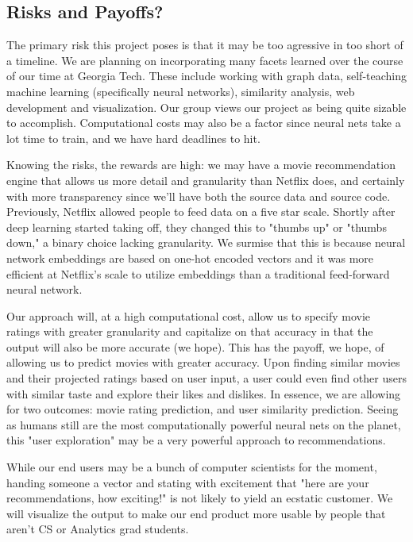 \subsection{Risks and Payoffs?}

The primary risk this project poses is that it may be too agressive in too short of a timeline. We are planning on incorporating many facets learned over the course of our time at Georgia Tech. These include working with graph data, self-teaching machine learning (specifically neural networks), similarity analysis, web development and visualization. Our group views our project as being quite sizable to accomplish. Computational costs may also be a factor since neural nets take a lot time to train, and we have hard deadlines to hit.

Knowing the risks, the rewards are high: we may have a movie recommendation engine that allows us more detail and granularity than Netflix does, and certainly with more transparency since we'll have both the source data and source code. Previously, Netflix allowed people to feed data on a five star scale. Shortly after deep learning started taking off, they changed this to "thumbs up" or "thumbs down," a binary choice lacking granularity. We surmise that this is because neural network embeddings are based on one-hot encoded vectors and it was more efficient at Netflix's scale to utilize embeddings than a traditional feed-forward neural network.

Our approach will, at a high computational cost, allow us to specify movie ratings with greater granularity and capitalize on that accuracy in that the output will also be more accurate (we hope). This has the payoff, we hope, of allowing us to predict movies with greater accuracy. Upon finding similar movies and their projected ratings based on user input, a user could even find other users with similar taste and explore their likes and dislikes. In essence, we are allowing for two outcomes: movie rating prediction, and user similarity prediction. Seeing as humans still are the most computationally powerful neural nets on the planet, this "user exploration" may be a very powerful approach to recommendations.

While our end users may be a bunch of computer scientists for the moment, handing someone a vector and stating with excitement that "here are your recommendations, how exciting!" is not likely to yield an ecstatic customer. We will visualize the output to make our end product more usable by people that aren't CS or Analytics grad students.
